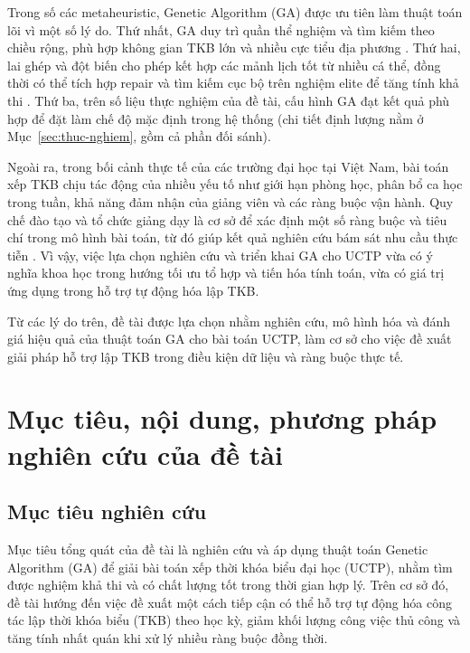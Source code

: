 \documentclass[a4paper,12pt,oneside]{article}
\begin{document}
	Trong số các metaheuristic, Genetic Algorithm (GA) được ưu tiên làm thuật toán lõi vì một số lý do. Thứ nhất, GA duy trì quần thể nghiệm và tìm kiếm theo chiều rộng, phù hợp không gian TKB lớn và nhiều cực tiểu địa phương \cite{burke1997automated,lewis2008survey,goldberg1989genetic}. Thứ hai, lai ghép và đột biến cho phép kết hợp các mảnh lịch tốt từ nhiều cá thể, đồng thời có thể tích hợp repair và tìm kiếm cục bộ trên nghiệm elite để tăng tính khả thi \cite{eiben2015introduction}. Thứ ba, trên số liệu thực nghiệm của đề tài, cấu hình GA đạt kết quả phù hợp để đặt làm chế độ mặc định trong hệ thống (chi tiết định lượng nằm ở Mục~\ref{sec:thuc-nghiem}, gồm cả phần đối sánh).
	
	Ngoài ra, trong bối cảnh thực tế của các trường đại học tại Việt Nam, bài toán xếp TKB chịu tác động của nhiều yếu tố như giới hạn phòng học, phân bổ ca học trong tuần, khả năng đảm nhận của giảng viên và các ràng buộc vận hành. Quy chế đào tạo và tổ chức giảng dạy là cơ sở để xác định một số ràng buộc và tiêu chí trong mô hình bài toán, từ đó giúp kết quả nghiên cứu bám sát nhu cầu thực tiễn \cite{phenikaa2023quyche}. Vì vậy, việc lựa chọn nghiên cứu và triển khai GA cho UCTP vừa có ý nghĩa khoa học trong hướng tối ưu tổ hợp và tiến hóa tính toán, vừa có giá trị ứng dụng trong hỗ trợ tự động hóa lập TKB.
	
	Từ các lý do trên, đề tài được lựa chọn nhằm nghiên cứu, mô hình hóa và đánh giá hiệu quả của thuật toán GA cho bài toán UCTP, làm cơ sở cho việc đề xuất giải pháp hỗ trợ lập TKB trong điều kiện dữ liệu và ràng buộc thực tế.
	
	\section*{Mục tiêu, nội dung, phương pháp nghiên cứu của đề tài}
	
	\subsection*{Mục tiêu nghiên cứu}
	
	Mục tiêu tổng quát của đề tài là nghiên cứu và áp dụng thuật toán Genetic Algorithm (GA) để giải bài toán xếp thời khóa biểu đại học (UCTP), nhằm tìm được nghiệm khả thi và có chất lượng tốt trong thời gian hợp lý. Trên cơ sở đó, đề tài hướng đến việc đề xuất một cách tiếp cận có thể hỗ trợ tự động hóa công tác lập thời khóa biểu (TKB) theo học kỳ, giảm khối lượng công việc thủ công và tăng tính nhất quán khi xử lý nhiều ràng buộc đồng thời.
	
\end{document}
